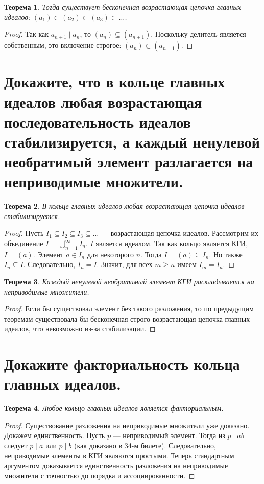 \documentclass[12pt, a4paper]{article}
\theoremstyle{definition}
\theoremstyle{plain}
\newtheorem{theorem}{Теорема}[section]
\begin{document}
	\begin{theorem}
		Тогда существует бесконечная возрастающая цепочка главных идеалов: $(a_1) \subset (a_2) \subset (a_3) \subset \dots$.
	\end{theorem}
	\begin{proof}
		Так как $a_{n+1} \mid a_n$, то $(a_n) \subseteq (a_{n+1})$. Поскольку делитель является собственным, это включение строгое: $(a_n) \subset (a_{n+1})$.
	\end{proof}
	
	\newpage
	\section{Докажите, что в кольце главных идеалов любая возрастающая последовательность идеалов стабилизируется, а каждый ненулевой необратимый элемент разлагается на неприводимые множители.}
	
	\begin{theorem}
		В кольце главных идеалов любая возрастающая цепочка идеалов стабилизируется.
	\end{theorem}
	\begin{proof}
		Пусть $I_1 \subseteq I_2 \subseteq I_3 \subseteq \dots$ — возрастающая цепочка идеалов. Рассмотрим их объединение $I = \bigcup_{n=1}^\infty I_n$. $I$ является идеалом. Так как кольцо является КГИ, $I = (a)$. Элемент $a \in I_n$ для некоторого $n$. Тогда $I = (a) \subseteq I_n$. Но также $I_n \subseteq I$. Следовательно, $I_n = I$. Значит, для всех $m \ge n$ имеем $I_m = I_n$.
	\end{proof}
	
	\begin{theorem}
		Каждый ненулевой необратимый элемент КГИ раскладывается на неприводимые множители.
	\end{theorem}
	\begin{proof}
		Если бы существовал элемент без такого разложения, то по предыдущим теоремам существовала бы бесконечная строго возрастающая цепочка главных идеалов, что невозможно из-за стабилизации.
	\end{proof}
	
	\newpage
	\section{Докажите факториальность кольца главных идеалов.}
	
	\begin{theorem}
		Любое кольцо главных идеалов является факториальным.
	\end{theorem}
	\begin{proof}
		Существование разложения на неприводимые множители уже доказано. Докажем единственность. Пусть $p$ — неприводимый элемент. Тогда из $p \mid ab$ следует $p \mid a$ или $p \mid b$ (как доказано в 34-м билете). Следовательно, неприводимые элементы в КГИ являются простыми. Теперь стандартным аргументом доказывается единственность разложения на неприводимые множители с точностью до порядка и ассоциированности.
	\end{proof}
	
\end{document}
